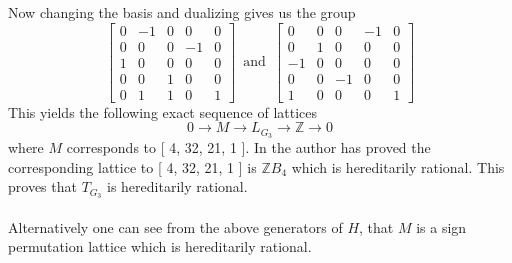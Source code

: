 \documentclass{article}
\theoremstyle{plain}
\theoremstyle{definition}
\newcommand{\Z}{\ensuremath{\mathbb{Z}}}
\newcommand{\tand}{\ensuremath{\,\,\, \text{and} \,\,\,}}
\begin{document}
Now changing the basis and dualizing gives us the group
$$
\left[ \begin {array}{cccc|c} 0&-1&0&0&0\\ 0&0&0&-1&0
\\ 1&0&0&0&0\\ 0&0&1&0&0
\\ \hline 0&1&1&0&1\end {array} \right] 
\tand
 \left[ \begin {array}{cccc|c} 0&0&0&-1&0\\ 0&1&0&0&0
\\-1&0&0&0&0\\ 0&0&-1&0&0
\\ \hline 1&0&0&0&1\end {array} \right] 
$$
This yields the following exact sequence of lattices
$$0 \longrightarrow M \longrightarrow L_{G_3} \longrightarrow \Z \longrightarrow 0$$ where $M$ corresponds to 
[ 4, 32, 21, 1 ].
In \cite{Nicole1} the author has proved the corresponding lattice to [ 4, 32, 21, 1 ] is $\mathbb{Z}B_4$ which is hereditarily rational. This proves that $T_{G_3}$ is hereditarily rational.\\
\\ Alternatively one can see from the above generators of $H$, that $M$ is a sign permutation lattice which is hereditarily rational.
%
\end{document}

